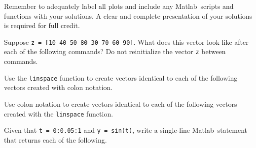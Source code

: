 \documentclass[12pt]{exam}
\newcommand{\matlab}{{\sc Matlab}}
\begin{document}
Remember to adequately label all plots and include any \matlab~scripts and functions with your solutions. A clear and complete presentation of your solutions is required for full credit.
\begin{questions}

\question Suppose \verb$z = [10 40 50 80 30 70 60 90]$. What does this vector look like after each of the following commands? Do not reinitialize the vector \verb$z$ between commands.

\question Use the \verb$linspace$ function to create vectors identical to each of the following vectors created with colon notation.

\question Use colon notation to create vectors identical to each of the following vectors created with the \verb$linspace$ function.

\question Given that \verb$t = 0:0.05:1$ and \verb$y = sin(t)$, write a single-line \matlab\ statement that returns each of the following.
\begin{parts}

\end{parts}
\end{questions}
\end{document}
